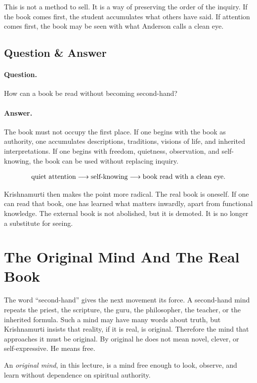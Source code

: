 This is not a method to sell. It is a way of preserving the order of the inquiry. If the book comes first, the student accumulates what others have said. If attention comes first, the book may be seen with what Anderson calls a clean eye.

\subsection{Question \& Answer}

\paragraph{Question.}
How can a book be read without becoming second-hand?

\paragraph{Answer.}
The book must not occupy the first place. If one begins with the book as authority, one accumulates descriptions, traditions, visions of life, and inherited interpretations. If one begins with freedom, quietness, observation, and self-knowing, the book can be used without replacing inquiry.

\begin{align}
\hbox{quiet attention}
\longrightarrow \hbox{self-knowing}
\longrightarrow \hbox{book read with a clean eye}.
\end{align}

Krishnamurti then makes the point more radical. The real book is oneself. If one can read that book, one has learned what matters inwardly, apart from functional knowledge. The external book is not abolished, but it is demoted. It is no longer a substitute for seeing.

\section{The Original Mind And The Real Book}

The word ``second-hand'' gives the next movement its force. A second-hand mind repeats the priest, the scripture, the guru, the philosopher, the teacher, or the inherited formula. Such a mind may have many words about truth, but Krishnamurti insists that reality, if it is real, is original. Therefore the mind that approaches it must be original. By original he does not mean novel, clever, or self-expressive. He means free.

\begin{definition}
An \emph{original mind}, in this lecture, is a mind free enough to look, observe, and learn without dependence on spiritual authority.
\end{definition}

